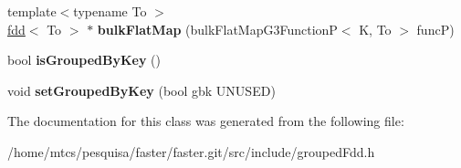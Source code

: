 \begin{DoxyCompactItemize}
\item 
\hypertarget{classfaster_1_1groupedFdd_afd1b583d3f24c565011797491849dd4e}{}\label{classfaster_1_1groupedFdd_afd1b583d3f24c565011797491849dd4e} 
{\footnotesize template$<$typename To $>$ }\\\hyperlink{classfaster_1_1fdd}{fdd}$<$ To $>$ $\ast$ {\bfseries bulk\+Flat\+Map} (bulk\+Flat\+Map\+G3\+FunctionP$<$ K, To $>$ funcP)
\item 
\hypertarget{classfaster_1_1groupedFdd_ad1ed9e32f977574a9e0a12396e6578aa}{}\label{classfaster_1_1groupedFdd_ad1ed9e32f977574a9e0a12396e6578aa} 
bool {\bfseries is\+Grouped\+By\+Key} ()
\item 
\hypertarget{classfaster_1_1groupedFdd_a9228818350b8ff2fdbeba48f06d57e00}{}\label{classfaster_1_1groupedFdd_a9228818350b8ff2fdbeba48f06d57e00} 
void {\bfseries set\+Grouped\+By\+Key} (bool gbk U\+N\+U\+S\+ED)
\end{DoxyCompactItemize}


The documentation for this class was generated from the following file\+:\begin{DoxyCompactItemize}
\item 
/home/mtcs/pesquisa/faster/faster.\+git/src/include/grouped\+Fdd.\+h\end{DoxyCompactItemize}
